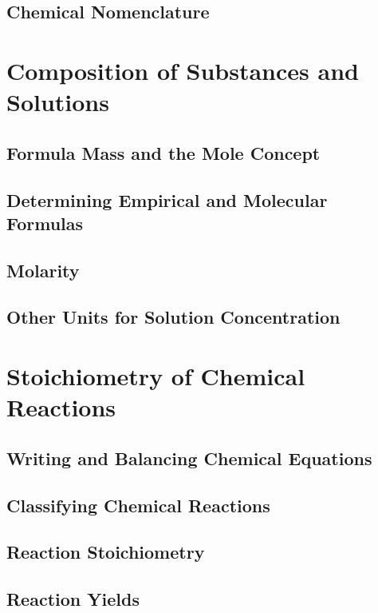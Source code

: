 \documentclass[12pt, openany, letterpaper]{memoir}
\begin{document}
\section{Chemical Nomenclature}

\chapter{Composition of Substances and Solutions}

\section{Formula Mass and the Mole Concept}

\section{Determining Empirical and Molecular Formulas}

\section{Molarity}

\section{Other Units for Solution Concentration}

\chapter{Stoichiometry of Chemical Reactions}

\section{Writing and Balancing Chemical Equations}

\section{Classifying Chemical Reactions}

\section{Reaction Stoichiometry}

\section{Reaction Yields}
\end{document}

